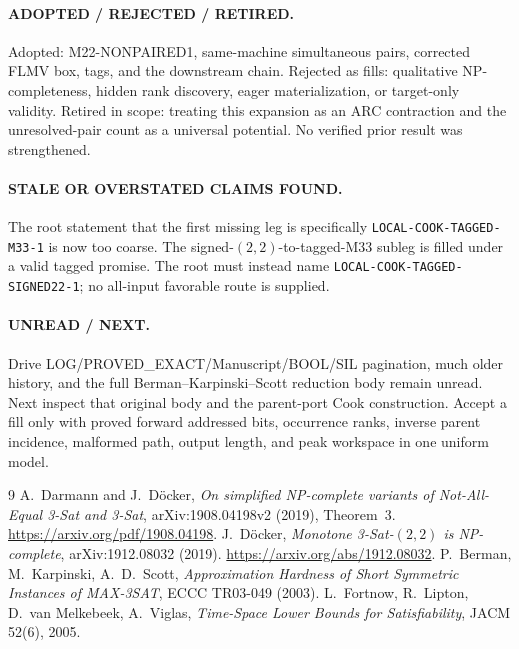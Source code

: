 \documentclass[11pt]{article}
\begin{document}
\paragraph{ADOPTED / REJECTED / RETIRED.}
Adopted: M22-NONPAIRED1, same-machine simultaneous pairs, corrected FLMV box,
tags, and the downstream chain.  Rejected as fills: qualitative
NP-completeness, hidden rank discovery, eager materialization, or target-only
validity.  Retired in scope: treating this expansion as an ARC contraction
and the unresolved-pair count as a universal potential.  No verified prior
result was strengthened.

\paragraph{STALE OR OVERSTATED CLAIMS FOUND.}
The root statement that the first missing leg is specifically
\texttt{LOCAL-COOK-TAGGED-M33-1} is now too coarse.  The
signed-$(2,2)$-to-tagged-M33 subleg is filled under a valid tagged promise.
The root must instead name \texttt{LOCAL-COOK-TAGGED-SIGNED22-1}; no
all-input favorable route is supplied.

\paragraph{UNREAD / NEXT.}
Drive LOG/PROVED\_EXACT/Manuscript/BOOL/SIL pagination, much older history,
and the full Berman--Karpinski--Scott reduction body remain unread.  Next
inspect that original body and the parent-port Cook construction.  Accept a
fill only with proved forward addressed bits, occurrence ranks, inverse
parent incidence, malformed path, output length, and peak workspace in one
uniform model.

\begin{thebibliography}{9}
 A.~Darmann and J.~D\"ocker,
\emph{On simplified NP-complete variants of Not-All-Equal 3-Sat and 3-Sat},
arXiv:1908.04198v2 (2019), Theorem~3.
\url{https://arxiv.org/pdf/1908.04198}.
 J.~D\"ocker,
\emph{Monotone 3-Sat-$(2,2)$ is NP-complete},
arXiv:1912.08032 (2019). \url{https://arxiv.org/abs/1912.08032}.
 P.~Berman, M.~Karpinski, A.~D.~Scott,
\emph{Approximation Hardness of Short Symmetric Instances of MAX-3SAT},
ECCC TR03-049 (2003).
 L.~Fortnow, R.~Lipton, D.~van Melkebeek, A.~Viglas,
\emph{Time-Space Lower Bounds for Satisfiability}, JACM 52(6), 2005.
\end{thebibliography}
\end{document}
